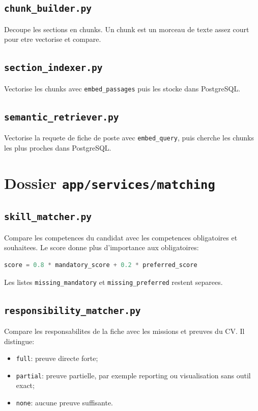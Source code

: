 \documentclass[12pt,a4paper]{article}
\begin{document}
\subsection{\texttt{chunk\_builder.py}}

Decoupe les sections en chunks. Un chunk est un morceau de texte assez court pour etre vectorise et compare.

\subsection{\texttt{section\_indexer.py}}

Vectorise les chunks avec \texttt{embed\_passages} puis les stocke dans PostgreSQL.

\subsection{\texttt{semantic\_retriever.py}}

Vectorise la requete de fiche de poste avec \texttt{embed\_query}, puis cherche les chunks les plus proches dans PostgreSQL.

\section{Dossier \texttt{app/services/matching}}

\subsection{\texttt{skill\_matcher.py}}

Compare les competences du candidat avec les competences obligatoires et souhaitees. Le score donne plus d'importance aux obligatoires:

\begin{lstlisting}[style=smartcode,language=Python]
score = 0.8 * mandatory_score + 0.2 * preferred_score
\end{lstlisting}

Les listes \texttt{missing\_mandatory} et \texttt{missing\_preferred} restent separees.

\subsection{\texttt{responsibility\_matcher.py}}

Compare les responsabilites de la fiche avec les missions et preuves du CV. Il distingue:

\begin{itemize}
  \item \texttt{full}: preuve directe forte;
  \item \texttt{partial}: preuve partielle, par exemple reporting ou visualisation sans outil exact;
  \item \texttt{none}: aucune preuve suffisante.
\end{itemize}
\end{document}
